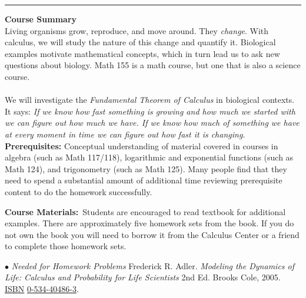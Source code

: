 \documentclass[11pt]{article}
\begin{document}
\vspace{2 mm}
 

 
  \vspace{2mm}
 
\hrule

\vspace{3mm}

\textbf{Course Summary} \\

\noindent Living organisms grow, reproduce, and move around. They \textit{change}. With calculus, we will study the nature of this change and quantify it.  Biological examples motivate mathematical concepts, which in turn lead us to ask new questions about biology. Math 155 is a math course, but one that is also a science course. \\
\\
We will investigate the \textit {Fundamental Theorem of Calculus} in biological contexts. It says: \textit{If we know how fast something is growing and how much we started with we can figure out how much we have. If we know how much of something we have at every moment in time we can figure out how fast it is changing.}\\


\noindent \textbf{Prerequisites:}  Conceptual understanding of material covered in courses in algebra (such as Math 117/118), logarithmic and exponential functions (such as Math 124), and trigonometry (such as Math 125). Many people find that they need to spend a substantial amount of additional time reviewing prerequisite content to do the homework successfully. 

\vspace{1mm}

\noindent \textbf{Course Materials:}\
Students are encouraged to read textbook for additional examples. There are approximately five homework sets from the book. If you do not own the book you will need to borrow it from the Calculus Center or a friend to complete those homework sets.\\

\vspace{1 mm}

\noindent $\bullet$ \textit{Needed for Homework Problems} Frederick R. Adler. \textit{Modeling the Dynamics of Life: Calculus and Probability for Life Scientists} 2nd Ed. Brooks Cole, 2005.  \url{ISBN} \url{0-534-40486-3}.

\vspace{1mm}
\end{document}
